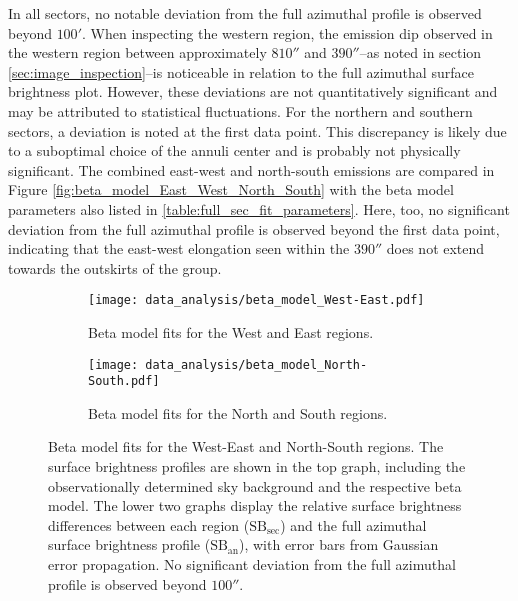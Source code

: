 In all sectors, no notable deviation from the full azimuthal profile is observed beyond \(100'\). When inspecting the western region, the emission dip observed in the western region between approximately \(810''\) and \(390''\)--as noted in section \ref{sec:image_inspection}--is noticeable in relation to the full azimuthal surface brightness plot. However, these deviations are not quantitatively significant and may be attributed to statistical fluctuations. For the northern and southern sectors, a deviation is noted at the first data point. This discrepancy is likely due to a suboptimal choice of the annuli center and is probably not physically significant. The combined east-west and north-south emissions are compared in Figure \ref{fig:beta_model_East_West_North_South} with the beta model parameters also listed in \ref{table:full_sec_fit_parameters}. Here, too, no significant deviation from the full azimuthal profile is observed beyond the first data point, indicating that the east-west elongation seen within the \(390''\) does not extend towards the outskirts of the group.
\begin{figure}[htbp]
    \centering
    \begin{subfigure}{\textwidth}
        \centering
        \texttt{[image: data\_analysis/beta\_model\_West-East.pdf]}
        \caption{Beta model fits for the West and East regions.}
        \label{fig:beta_model_West_East}
    \end{subfigure}
    \vspace{0.5cm} 
    \begin{subfigure}{\textwidth}
        \centering
        \texttt{[image: data\_analysis/beta\_model\_North-South.pdf]}
        \caption{Beta model fits for the North and South regions.}
        \label{fig:beta_model_North_South}
    \end{subfigure}
    \caption{Beta model fits for the West-East and North-South regions. The surface brightness profiles are shown in the top graph, including the observationally determined sky background and the respective beta model. The lower two graphs display the relative surface brightness differences between each region (\(\text{SB}_{\text{sec}}\)) and the full azimuthal surface brightness profile (\(\text{SB}_{\text{an}}\)), with error bars from Gaussian error propagation. No significant deviation from the full azimuthal profile is observed beyond \(100''\).}
    \label{fig:beta_models_West_North}
\end{figure}
%
